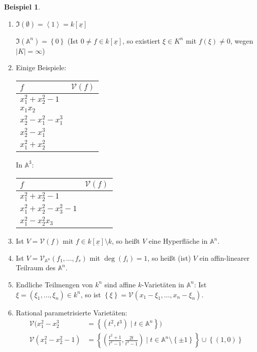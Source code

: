 \documentclass[
twoside=semi,
fontsize=12,
DIV=12, 
cleardoublepage=current,
leqno,
headings=optiontoheadandtoc, 
toc=idx
]{scrbook}
\newcommand{\A}{\mathbb{A}}
\newcommand{\V}{\mathcal{V}}
\newcommand{\x}{\underline{x}}
\newcommand{\I}{\mathfrak{I}}
\newcommand{\brac}[1]{\left( #1 \right)}
\newcommand{\bracC}[1]{\left< #1 \right>}
\newcommand{\set}[1]{\left\{ #1 \right\}}
\theoremstyle{definition}
\newtheorem{beispiel}[definition]{Beispiel}
\begin{document}
	\begin{beispiel}\label{1.2.8}\hfill
		\begin{enumerate}[1.]
			
			\item $\I(\emptyset) = \bracC{1} = k[\x]$
			
			\smallskip\noindent
			$\I(\A^n) = \set{0}$ (Ist $0 \neq f \in k[\x]$, so existiert $\xi \in K^n$ mit $f(\xi) \neq 0$, wegen $|K| = \infty$)
			
			\item Einige Beispiele:\newline
			\begin{center}
				\begin{tabular}{l|c} %
					$f$ & $\V(f)$\\\hline
					$x_1^2+x_2^2-1$ & \\
					$x_1x_2$ & \\
					$x_2^2-x_1^2-x_1^3$ & \\
					$x_2^2-x_1^3$ & \\
					$x_1^2+x_2^2$ & 
				\end{tabular}
				
				\medskip
				In $\A^3$:\newline
				\begin{tabular}{l|c} %
					$f$ & $\V(f)$\\\hline
					$x_1^2+x_2^2-1$ & \\
					$x_1^2+x_2^2-x_3^2 -1$ & \\
					$x_1^2-x_2^2x_3$ & 
				\end{tabular}
			\end{center}
			
			
			\item Ist $V = \V(f)$ mit $f \in k[\x] \setminus k$, so hei\ss t $V$ eine Hyperfl\"ache in $\A^n$.
			
			\item Ist $V = \V_{\A^n}(f_1, \dots, f_r)$ mit $\deg(f_i) = 1$, so hei\ss t (ist) $V$ ein affin-linearer Teilraum des $\A^n$.
			
			\item Endliche Teilmengen von $k^n$ sind affine $k$-Variet\"aten in $\A^n$: Ist $\xi = (\xi_1, \dots, \xi_n) \in k^n$, so ist
			$\set{\xi} = \V(x_1-\xi_1, \dots, x_n-\xi_n)$.
			
			\item Rational parametrisierte Variet\"aten:
			\begin{align*}
				\V(x_1^2-x_2^3 &= \set{(t^2,t^3) \mid t \in \A^n})\\
				\V(x_1^2-x_2^2-1) &= \set{\brac{\frac{t^2+1}{t^2-1}, \frac{2t}{t^2-1}} \mid t \in \A^n \setminus \set{\pm 1}} \cup \set{(1,0)}
			\end{align*}
		\end{enumerate}
	\end{beispiel}
\end{document}
